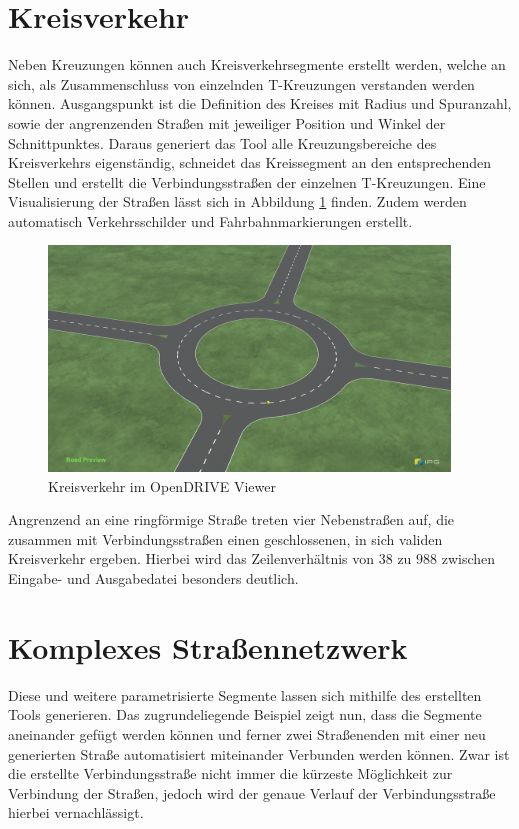 \section{Kreisverkehr}
Neben Kreuzungen können auch Kreisverkehrsegmente erstellt werden, welche an sich, als Zusammenschluss von einzelnden T-Kreuzungen verstanden werden können. Ausgangspunkt ist die Definition des Kreises mit Radius und Spuranzahl, sowie der angrenzenden Straßen mit jeweiliger Position und Winkel der Schnittpunktes. Daraus generiert das Tool alle Kreuzungsbereiche des Kreisverkehrs eigenständig, schneidet das Kreissegment an den entsprechenden Stellen und erstellt die Verbindungsstraßen der einzelnen T-Kreuzungen. Eine Visualisierung der Straßen lässt sich in Abbildung \ref{abb8} finden. Zudem werden automatisch Verkehrsschilder und Fahrbahnmarkierungen erstellt.

\begin{figure}[H]
\flushleft
\includegraphics[width=0.95\textwidth]{fig/roundabout.png}
\caption{Kreisverkehr im OpenDRIVE Viewer}
\label{abb8}
\end{figure}

Angrenzend an eine ringförmige Straße treten vier Nebenstraßen auf, die zusammen mit Verbindungsstraßen einen geschlossenen, in sich validen Kreisverkehr ergeben. Hierbei wird das Zeilenverhältnis von \(38\) zu \(988\) zwischen Eingabe- und Ausgabedatei besonders deutlich.

\section{Komplexes Straßennetzwerk}

Diese und weitere parametrisierte Segmente lassen sich mithilfe des erstellten Tools generieren. Das zugrundeliegende Beispiel zeigt nun, dass die Segmente aneinander gefügt werden können und ferner zwei Straßenenden mit einer neu generierten Straße automatisiert miteinander Verbunden werden können. Zwar ist die erstellte Verbindungsstraße nicht immer die kürzeste Möglichkeit zur Verbindung der Straßen, jedoch wird der genaue Verlauf der Verbindungsstraße hierbei vernachlässigt.

